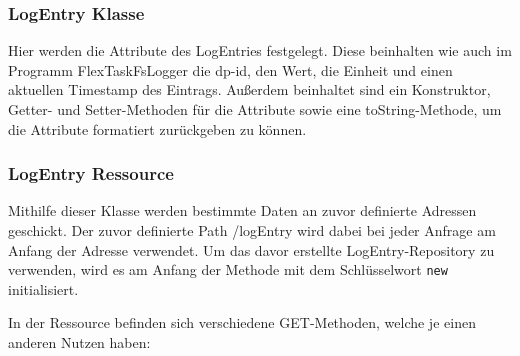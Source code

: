 \subsubsection{LogEntry Klasse}
Hier werden die Attribute des LogEntries festgelegt. Diese beinhalten wie auch im Programm FlexTaskFsLogger die dp-id, den Wert, die Einheit und einen aktuellen Timestamp des Eintrags.
Außerdem beinhaltet sind ein Konstruktor, Getter- und Setter-Methoden für die Attribute sowie eine toString-Methode, um die Attribute formatiert zurückgeben zu können.
 
\subsubsection{LogEntry Ressource}
Mithilfe dieser Klasse werden bestimmte Daten an zuvor definierte Adressen geschickt.
Der zuvor definierte Path \glq /logEntry\grq{} wird dabei bei jeder Anfrage am Anfang der Adresse verwendet.
Um das davor erstellte LogEntry-Repository zu verwenden, wird es am Anfang der Methode mit dem Schlüsselwort \texttt{new} initialisiert.

In der Ressource befinden sich verschiedene GET-Methoden, welche je einen anderen Nutzen haben:
 
